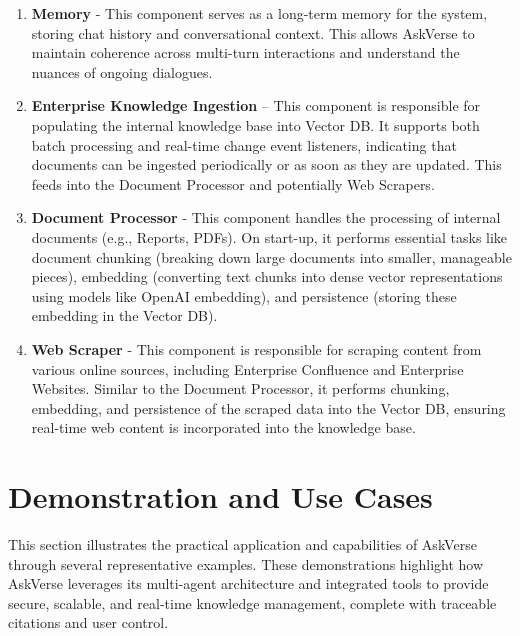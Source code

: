 \documentclass[default]{sn-jnl}%
\begin{document}
\begin{enumerate}
\begin{itemize}
    \end{itemize}
    \item \textbf{Memory} - This component serves as a long-term memory for the system, storing chat history and conversational context. This allows AskVerse to maintain coherence across multi-turn interactions and understand the nuances of ongoing dialogues.
    \item \textbf{Enterprise Knowledge Ingestion} – This component is responsible for populating the internal knowledge base into Vector DB. It supports both batch processing and real-time change event listeners, indicating that documents can be ingested periodically or as soon as they are updated. This feeds into the Document Processor and potentially Web Scrapers.
    \item \textbf{Document Processor} - This component handles the processing of internal documents (e.g., Reports, PDFs). On start-up, it performs essential tasks like document chunking (breaking down large documents into smaller, manageable pieces), embedding (converting text chunks into dense vector representations using models like OpenAI embedding), and persistence (storing these embedding in the Vector DB).
    \item \textbf{Web Scraper} - This component is responsible for scraping content from various online sources, including Enterprise Confluence and Enterprise Websites. Similar to the Document Processor, it performs chunking, embedding, and persistence of the scraped data into the Vector DB, ensuring real-time web content is incorporated into the knowledge base.
\end{enumerate}

\section*{Demonstration and Use Cases}
This section illustrates the practical application and capabilities of AskVerse through several representative examples. These demonstrations highlight how AskVerse leverages its multi-agent architecture and integrated tools to provide secure, scalable, and real-time knowledge management, complete with traceable citations and user control.
\end{document}
